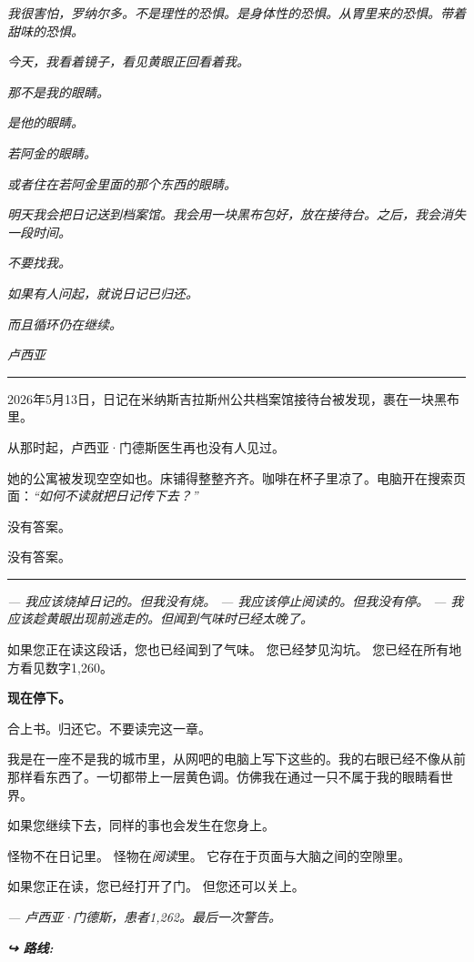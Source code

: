 \noindent \textit{我很害怕，罗纳尔多。不是理性的恐惧。是身体性的恐惧。从胃里来的恐惧。带着甜味的恐惧。}

\noindent \textit{今天，我看着镜子，看见黄眼正回看着我。}

\noindent \textit{那不是我的眼睛。}

\noindent \textit{是他的眼睛。}

\noindent \textit{若阿金的眼睛。}

\noindent \textit{或者住在若阿金里面的那个东西的眼睛。}

\noindent \textit{明天我会把日记送到档案馆。我会用一块黑布包好，放在接待台。之后，我会消失一段时间。}

\noindent \textit{不要找我。}

\noindent \textit{如果有人问起，就说日记已归还。}

\noindent \textit{而且循环仍在继续。}

\noindent \textit{卢西亚}

\vspace{0.5em}\noindent\rule{\textwidth}{0.5pt}\vspace{0.5em}

\noindent 2026年5月13日，日记在米纳斯吉拉斯州公共档案馆接待台被发现，裹在一块黑布里。

\noindent 从那时起，卢西亚·门德斯医生再也没有人见过。

\noindent 她的公寓被发现空空如也。床铺得整整齐齐。咖啡在杯子里凉了。电脑开在搜索页面：\textit{\textquotedblleft{}如何不读就把日记传下去？\textquotedblright{}}

\noindent 没有答案。

\noindent 没有答案。

\vspace{0.5em}\noindent\rule{\textwidth}{0.5pt}\vspace{0.5em}

\noindent \textit{--- 我应该烧掉日记的。但我没有烧。}
\noindent \textit{--- 我应该停止阅读的。但我没有停。}
\noindent \textit{--- 我应该趁黄眼出现前逃走的。但闻到气味时已经太晚了。}

\noindent 如果您正在读这段话，您也已经闻到了气味。
\noindent 您已经梦见沟坑。
\noindent 您已经在所有地方看见数字1,260。

\noindent \textbf{现在停下。}

\noindent 合上书。归还它。不要读完这一章。

\noindent 我是在一座不是我的城市里，从网吧的电脑上写下这些的。我的右眼已经不像从前那样看东西了。一切都带上一层黄色调。仿佛我在通过一只不属于我的眼睛看世界。

\noindent 如果您继续下去，同样的事也会发生在您身上。

\noindent 怪物不在日记里。
\noindent 怪物在\textit{阅读}里。
\noindent 它存在于页面与大脑之间的空隙里。

\noindent 如果您正在读，您已经打开了门。
\noindent 但您还可以关上。

\noindent \textit{--- 卢西亚·门德斯，患者1,262。最后一次警告。}

\vspace{0.5em}
\noindent\textit{\textbf{↪ 路线:}  \rotasep {}}
